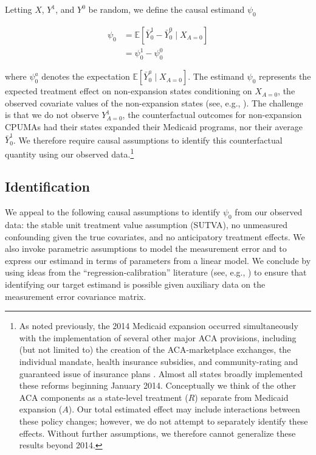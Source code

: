 \documentclass[aoas]{imsart}
\theoremstyle{plain}
\theoremstyle{remark}
\begin{document}
Letting $X$, $Y^1$, and $Y^0$ be random, we define the causal estimand $\psi_0$

\begin{align} \label{eqn:psi}
    \psi_0&= \mathbb{E}[\bar{Y}_0^1 - \bar{Y}_0^0 \mid X_{A=0}] \\ 
    &= \psi_0^1 - \psi_0^0
\end{align}

where $\psi_0^a$ denotes the expectation $\mathbb{E}[\bar{Y}_0^a \mid X_{A=0}]$. The estimand $\psi_0$ represents the expected treatment effect on non-expansion states conditioning on $X_{A=0}$, the observed covariate values of the non-expansion states (see, e.g., \citet{imbens2004nonparametric}). The challenge is that we do not observe $Y^1_{A=0}$, the counterfactual outcomes for non-expansion CPUMAs had their states expanded their Medicaid programs, nor their average $\bar{Y}^1_0$. We therefore require causal assumptions to identify this counterfactual quantity using our observed data.\footnote{As noted previously, the 2014 Medicaid expansion occurred simultaneously with the implementation of several other major ACA provisions, including (but not limited to) the creation of the ACA-marketplace exchanges, the individual mandate, health insurance subsidies, and community-rating and guaranteed issue of insurance plans \citep{courtemanche2017early}. Almost all states broadly implemented these reforms beginning January 2014. Conceptually we think of the other ACA components as a state-level treatment ($R$) separate from Medicaid expansion ($A$). Our total estimated effect may include interactions between these policy changes; however, we do not attempt to separately identify these effects. Without further assumptions, we therefore cannot generalize these results beyond 2014.} 

\subsection{Identification} \label{ssec:identification}

We appeal to the following causal assumptions to identify $\psi_0$ from our observed data: the stable unit treatment value assumption (SUTVA), no unmeasured confounding given the true covariates, and no anticipatory treatment effects. We also invoke parametric assumptions to model the measurement error and to express our estimand in terms of parameters from a linear model. We conclude by using ideas from the ``regression-calibration'' literature (see, e.g., \citet{gleser1992importance}) to ensure that identifying our target estimand is possible given auxiliary data on the measurement error covariance matrix.
\end{document}
